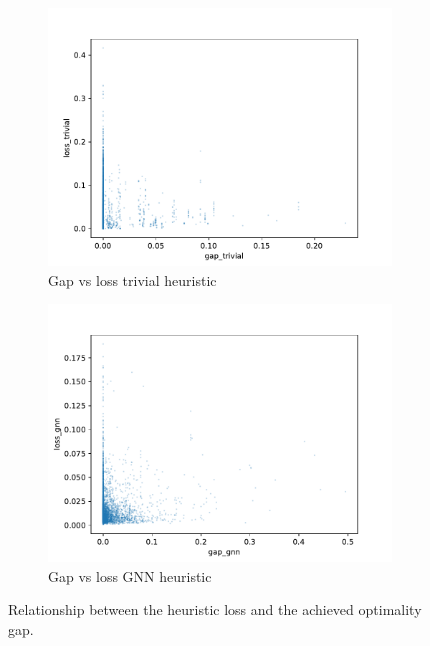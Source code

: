 \documentclass[english, 12pt, a4paper, sci, utf8, a-2b, online]{aaltothesis}
\begin{document}
\begin{figure}
    \begin{subfigure}{0.5\textwidth}
        \centering
        \includegraphics[width=\linewidth]{figures/gap-loss-trivial.pdf}
        \caption{Gap vs loss trivial heuristic}
        \label{fig:gap-loss-trivial}
    \end{subfigure}
    \begin{subfigure}{0.5\textwidth}
        \centering
        \includegraphics[width=\linewidth]{figures/gap-loss-gnn.pdf}
        \caption{Gap vs loss GNN heuristic}
        \label{fig:gap-loss-gnn}
    \end{subfigure}
    \caption{Relationship between the heuristic loss and the achieved optimality gap.}
    \label{fig:gap-loss}
\end{figure}
\end{document}
